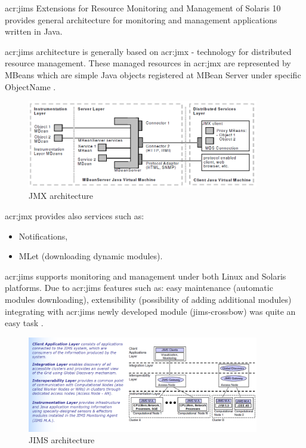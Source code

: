 \documentclass[11pt]{book}
\begin{document}
      \gls{acr:jims} Extensions for Resource Monitoring and Management of Solaris 10 provides general architecture for
      monitoring and management applications written in Java. 

      \gls{acr:jims} architecture is generally based on \gls{acr:jmx} - technology for distributed resource management.
      These managed resources in \gls{acr:jmx} are represented by MBeans which are simple Java objects registered at MBean Server
      under specific ObjectName \cite{jims}.
    
      \begin{figure}[H]
        \begin{center}
          \includegraphics[width=0.9\textwidth]{img/jims/jmx.png}
        \end{center}
        \caption{JMX architecture \cite{jims}}
      \end{figure}
	
      \gls{acr:jmx} provides also services such as:

      \begin{itemize}
        \item Notifications,
        \item MLet (downloading dynamic modules).
      \end{itemize}
	
      \gls{acr:jims} supports monitoring and management under both Linux and Solaris
      platforms.  Due to \gls{acr:jims} features such as: easy maintenance (automatic modules downloading), extensibility
      (possibility of adding additional modules) integrating with \gls{acr:jims} newly developed module (jims-crossbow) was quite
      an easy task \cite{jims}.
    
      \begin{figure}[H]
        \begin{center}
          \includegraphics[width=0.9\textwidth]{img/jims/jims.png}
        \end{center}
        \caption{JIMS architecture \cite{jims}}
      \end{figure}
	 
\end{document}
